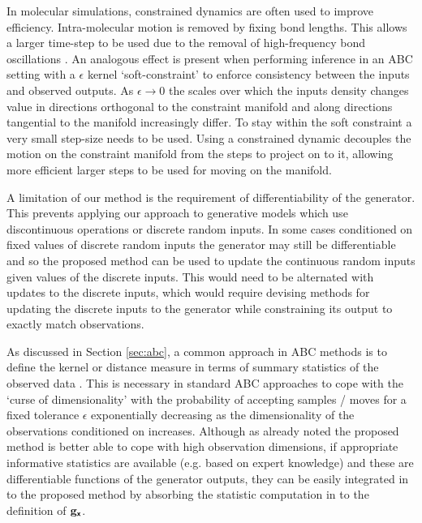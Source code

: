 In molecular simulations, constrained dynamics are often used to improve efficiency. Intra-molecular motion is removed by fixing bond lengths. This allows a larger time-step to be used due to the removal of high-frequency bond oscillations \citep{leimkuhler2016efficient}. An analogous effect is present when performing inference in an \ac{ABC} setting with a $\epsilon$ kernel `soft-constraint' to enforce consistency between the inputs and observed outputs. As $\epsilon \to 0$ the scales over which the inputs density changes value in directions orthogonal to the constraint manifold and along directions tangential to the manifold increasingly differ. To stay within the soft constraint a very small step-size needs to be used. Using a constrained dynamic decouples the motion on the constraint manifold from the steps to project on to it, allowing more efficient larger steps to be used for moving on the manifold.

A limitation of our method is the requirement of differentiability of the generator. This prevents applying our approach to generative models which use discontinuous operations or discrete random inputs. In some cases conditioned on fixed values of discrete random inputs the generator may still be differentiable and so the proposed method can be used to update the continuous random inputs given values of the discrete inputs. This would need to be alternated with updates to the discrete inputs, which would require devising methods for updating the discrete inputs to the generator while constraining its output to exactly match observations.

As discussed in Section \ref{sec:abc}, a common approach in \ac{ABC} methods is to define the kernel or distance measure in terms of summary statistics of the observed data \citep{prangle2015summary,marin2012approximate}. This is necessary in standard \ac{ABC} approaches to cope with the `curse of dimensionality' with the probability of accepting samples / moves for a fixed tolerance $\epsilon$ exponentially decreasing as the dimensionality of the observations conditioned on increases. Although as already noted the proposed method is better able to cope with high observation dimensions, if appropriate informative statistics are available (e.g. based on expert knowledge) and these are differentiable functions of the generator outputs, they can be easily integrated in to the proposed method by absorbing the statistic computation in to the definition of ${\mathbf{g}}_{\boldsymbol{\mathsf{x}}}$.
